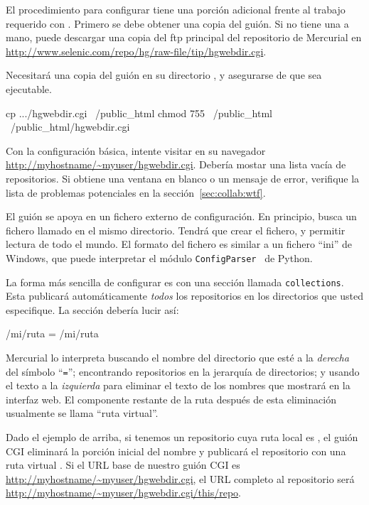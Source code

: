 El procedimiento para configurar  tiene una
porción adicional frente al trabajo requerido con
.  Primero se debe obtener una copia del
guión. Si no tiene una a mano, puede descargar una copia del ftp
principal del repositorio de Mercurial en
\url{http://www.selenic.com/repo/hg/raw-file/tip/hgwebdir.cgi}.

Necesitará una copia del guión en su directorio ,
y asegurarse de que sea ejecutable.
\begin{codesample2}
  cp .../hgwebdir.cgi ~/public_html
  chmod 755 ~/public_html ~/public_html/hgwebdir.cgi
\end{codesample2}
Con la configuración básica, intente visitar en su navegador
\url{http://myhostname/~myuser/hgwebdir.cgi}.  Debería mostar una
lista vacía de repositorios.  Si obtiene una ventana en blanco o un
mensaje de error, verifique la lista de problemas potenciales en la 
sección~\ref{sec:collab:wtf}.

El guión  se apoya en un fichero externo de
configuración.  En principio, busca un fichero llamado
 en el mismo directorio.  Tendrá que crear el
fichero, y permitir lectura de todo el mundo.  El formato del fichero
es similar a un fichero ``ini'' de Windows, que puede interpretar el módulo
\texttt{ConfigParser}~\cite{web:configparser} de Python.

La forma más sencilla de configurar  es con
una sección llamada \texttt{collections}.  Esta publicará automáticamente
\emph{todos} los repositorios en los directorios que usted
especifique.  La sección debería lucir así:
\begin{codesample2}
  [collections]
  /mi/ruta = /mi/ruta
\end{codesample2}
Mercurial lo interpreta buscando el nombre del directorio que esté a la
\emph{derecha} del símbolo ``\texttt{=}''; encontrando repositorios en
la jerarquía de directorios; y usando el texto a la \emph{izquierda}
para eliminar el texto de los nombres que mostrará en la interfaz
web.  El componente restante de la ruta después de esta eliminación
usualmente se llama ``ruta virtual''.

Dado el ejemplo de arriba, si tenemos un repositorio cuya ruta local es
, el guión CGI eliminará la porción inicial
 del nombre y publicará el repositorio con una ruta
virtual .  Si el URL base de nuestro guión CGI es
\url{http://myhostname/~myuser/hgwebdir.cgi}, el URL completo al
repositorio será
\url{http://myhostname/~myuser/hgwebdir.cgi/this/repo}.

